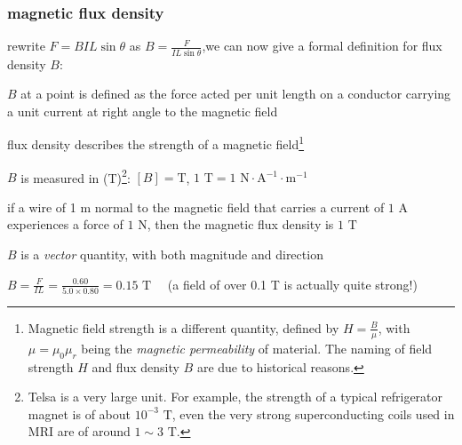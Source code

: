 \subsubsection{magnetic flux density} \label{sec:magnetic_flux_density}

rewrite $F=BIL\sin\theta$ as $B = \frac{F}{IL\sin\theta}$,we can now give a formal definition for flux density $B$:

\begin{ilight}
	 $B$ at a point is defined as the force acted per unit length on a conductor carrying a unit current at right angle to the magnetic field
\end{ilight}

\cmt flux density describes the strength of a magnetic field\footnote{Magnetic field strength is a different quantity, defined by $H=\frac{B}{\mu}$, with $\mu=\mu_0\mu_r$ being the \emph{magnetic permeability} of material. The naming of field strength $H$ and flux density $B$ are due to historical reasons.}

\cmt $B$ is measured in  (T)\footnote{Telsa is a very large unit. For example, the strength of a typical refrigerator magnet is of about $10^{-3} \text{ T}$, even the very strong superconducting coils used in MRI are of around $1\sim3 \text{ T}$.}: $[B]=\text{T}$, $1 \text{ T} = 1 \text{ N}\cdot\text{A}^{-1}\cdot\text{m}^{-1}$

\begin{ilight}
	if a wire of 1 m normal to the magnetic field that carries a current of $1\text{ A}$ experiences a force of $1\text{ N}$, then the magnetic flux density is $1\text{ T}$
\end{ilight}

\cmt $B$ is a \emph{vector} quantity, with both magnitude and direction


	
\sol $B=\frac{F}{IL} = \frac{0.60}{5.0\times0.80} = 0.15 \text{ T} \quad $ (a field of over 0.1 T is actually quite strong!) \eoe


\newpage
{}

